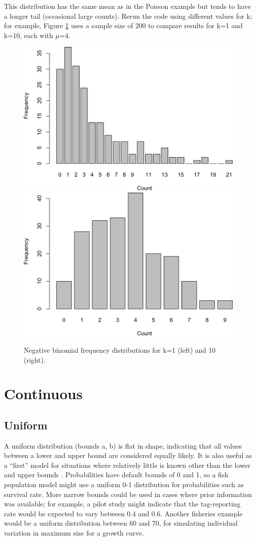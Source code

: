 \documentclass[
]{krantz}
\begin{document}
This distribution has the same mean as in the Poisson example but tends to have a longer tail (occasional large counts). Rerun the code using different values for k; for example, Figure \ref{fig:NB-vary-k} uses a sample size of 200 to compare results for k=1 and k=10, each with \(\mu\)=4.

\begin{figure}
\includegraphics[width=0.5\linewidth]{bookdown_files/figure-latex/NB-vary-k-1} \includegraphics[width=0.5\linewidth]{bookdown_files/figure-latex/NB-vary-k-2} \caption{Negative binomial frequency distributions for k=1 (left) and 10 (right).}\label{fig:NB-vary-k}
\end{figure}

\hypertarget{Continuous}{%
\section{Continuous}\label{Continuous}}

\hypertarget{Uniform}{%
\subsection{Uniform}\label{Uniform}}

A uniform distribution (bounds a, b) is flat in shape, indicating that all values between a lower and upper bound are considered equally likely. It is also useful as a ``first'' model for situations where relatively little is known other than the lower and upper bounds \citep{law.kelton_1982}. Probabilities have default bounds of 0 and 1, so a fish population model might use a uniform 0-1 distribution for probabilities such as survival rate. More narrow bounds could be used in cases where prior information was available; for example, a pilot study might indicate that the tag-reporting rate would be expected to vary between 0.4 and 0.6. Another fisheries example would be a uniform distribution between 60 and 70, for simulating individual variation in maximum size for a growth curve.
\end{document}
